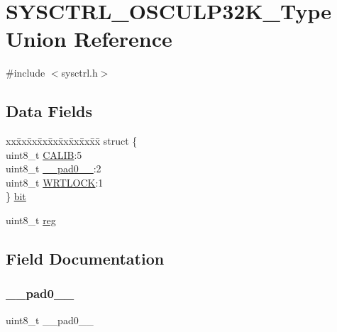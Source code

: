 \hypertarget{union_s_y_s_c_t_r_l___o_s_c_u_l_p32_k___type}{}\section{S\+Y\+S\+C\+T\+R\+L\+\_\+\+O\+S\+C\+U\+L\+P32\+K\+\_\+\+Type Union Reference}
\label{union_s_y_s_c_t_r_l___o_s_c_u_l_p32_k___type}


{\ttfamily \#include $<$sysctrl.\+h$>$}

\subsection*{Data Fields}
\begin{DoxyCompactItemize}
\item 
\begin{tabbing}
xx\=xx\=xx\=xx\=xx\=xx\=xx\=xx\=xx\=\kill
struct \{\\
\>uint8\_t \mbox{\hyperlink{union_s_y_s_c_t_r_l___o_s_c_u_l_p32_k___type_a5856ae0103da76afeefccdc47e58b992}{CALIB}}:5\\
\>uint8\_t \mbox{\hyperlink{union_s_y_s_c_t_r_l___o_s_c_u_l_p32_k___type_a8b4eebe79ded0459acec2f4950102ba3}{\_\_pad0\_\_}}:2\\
\>uint8\_t \mbox{\hyperlink{union_s_y_s_c_t_r_l___o_s_c_u_l_p32_k___type_add39e49670dc74cf1757f744e1bbabf4}{WRTLOCK}}:1\\
\} \mbox{\hyperlink{union_s_y_s_c_t_r_l___o_s_c_u_l_p32_k___type_a70b51075f52dadfa5ad043df36990cd5}{bit}}\\

\end{tabbing}\item 
uint8\+\_\+t \mbox{\hyperlink{union_s_y_s_c_t_r_l___o_s_c_u_l_p32_k___type_a9428adc9af4653a2050e2536b55dec8d}{reg}}
\end{DoxyCompactItemize}


\subsection{Field Documentation}
\mbox{\label{union_s_y_s_c_t_r_l___o_s_c_u_l_p32_k___type_a8b4eebe79ded0459acec2f4950102ba3}} 
\subsubsection{\texorpdfstring{\_\_pad0\_\_}{\_\_pad0\_\_}}
{\footnotesize\ttfamily uint8\+\_\+t \+\_\+\+\_\+pad0\+\_\+\+\_\+}

